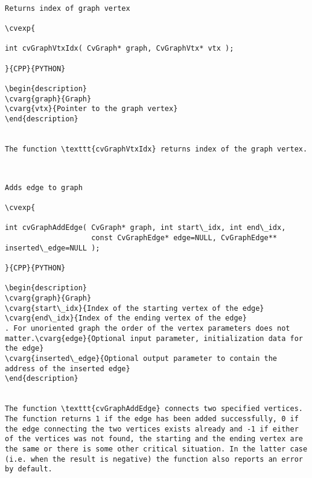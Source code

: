 \begin{verbatim}

Returns index of graph vertex

\cvexp{

int cvGraphVtxIdx( CvGraph* graph, CvGraphVtx* vtx );

}{CPP}{PYTHON}

\begin{description}
\cvarg{graph}{Graph}
\cvarg{vtx}{Pointer to the graph vertex}
\end{description}


The function \texttt{cvGraphVtxIdx} returns index of the graph vertex.


\end{verbatim}
\begin{verbatim}

Adds edge to graph

\cvexp{

int cvGraphAddEdge( CvGraph* graph, int start\_idx, int end\_idx,
                    const CvGraphEdge* edge=NULL, CvGraphEdge** inserted\_edge=NULL );

}{CPP}{PYTHON}

\begin{description}
\cvarg{graph}{Graph}
\cvarg{start\_idx}{Index of the starting vertex of the edge}
\cvarg{end\_idx}{Index of the ending vertex of the edge}
. For unoriented graph the order of the vertex parameters does not matter.\cvarg{edge}{Optional input parameter, initialization data for the edge}
\cvarg{inserted\_edge}{Optional output parameter to contain the address of the inserted edge}
\end{description}


The function \texttt{cvGraphAddEdge} connects two specified vertices. The function returns 1 if the edge has been added successfully, 0 if the edge connecting the two vertices exists already and -1 if either of the vertices was not found, the starting and the ending vertex are the same or there is some other critical situation. In the latter case (i.e. when the result is negative) the function also reports an error by default.


\end{verbatim}
